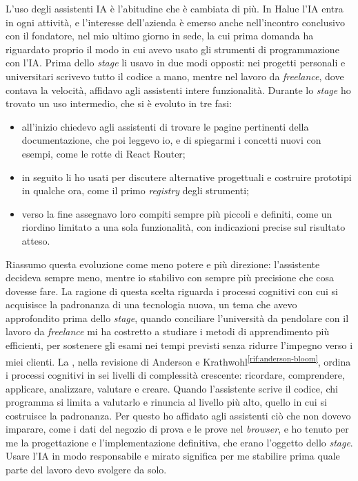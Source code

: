 L’uso degli assistenti IA è l’abitudine che è cambiata di più. In Halue l’IA entra in ogni attività,
e l’interesse dell’azienda è emerso anche nell’incontro conclusivo con il fondatore, nel mio ultimo
giorno in sede, la cui prima domanda ha riguardato proprio il modo in cui avevo usato gli strumenti
di programmazione con l’IA. Prima dello \emph{stage} li usavo in due modi opposti: nei progetti
personali e universitari scrivevo tutto il codice a mano, mentre nel lavoro da \emph{freelance},
dove contava la velocità, affidavo agli assistenti intere funzionalità. Durante lo \emph{stage} ho
trovato un uso intermedio, che si è evoluto in tre fasi:

\begin{itemize}
	\item all’inizio chiedevo agli assistenti di trovare le pagine pertinenti della documentazione,
	che poi leggevo io, e di spiegarmi i concetti nuovi con esempi, come le rotte di React Router;
	\item in seguito li ho usati per discutere alternative progettuali e costruire prototipi in
	qualche ora, come il primo \emph{registry} degli strumenti;
	\item verso la fine assegnavo loro compiti sempre più piccoli e definiti, come un riordino
	limitato a una sola funzionalità, con indicazioni precise sul risultato atteso.
\end{itemize}

Riassumo questa evoluzione come meno potere e più direzione: l’assistente decideva sempre meno,
mentre io stabilivo con sempre più precisione che cosa dovesse fare. La ragione di questa scelta
riguarda i processi cognitivi con cui si acquisisce la padronanza di una tecnologia nuova, un tema
che avevo approfondito prima dello \emph{stage}, quando conciliare l’università da pendolare con il
lavoro da \emph{freelance} mi ha costretto a studiare i metodi di apprendimento più efficienti, per
sostenere gli esami nei tempi previsti senza ridurre l’impegno verso i miei clienti. La
, nella revisione di Anderson e
Krathwohl\textsuperscript{\ref{rif:anderson-bloom}}, ordina i processi cognitivi in sei livelli di
complessità crescente: ricordare, comprendere, applicare, analizzare, valutare e creare. Quando
l’assistente scrive il codice, chi programma si limita a valutarlo e rinuncia al livello più alto,
quello in cui si costruisce la padronanza. Per questo ho affidato agli assistenti ciò che non dovevo
imparare, come i dati del negozio di prova e le prove nel \emph{browser}, e ho tenuto per me la
progettazione e l’implementazione definitiva, che erano l’oggetto dello \emph{stage}. Usare l’IA in
modo responsabile e mirato significa per me stabilire prima quale parte del lavoro devo svolgere da
solo.

